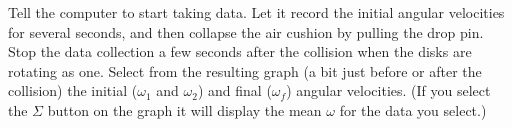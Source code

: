 Tell the computer to start taking data.  Let it record the initial
angular velocities for several seconds, and then collapse the air
cushion by pulling the drop pin.  Stop the data collection a few
seconds after the collision when the disks are rotating as one.
%
Select from the resulting graph (a bit just before or after the collision)
the initial ($\omega_{1}$ and $\omega_{2}$) and final ($\omega_{f}$)
angular velocities. (If you select the $\Sigma$ button on the graph it
will display the mean $\omega$ for the data you select.)



